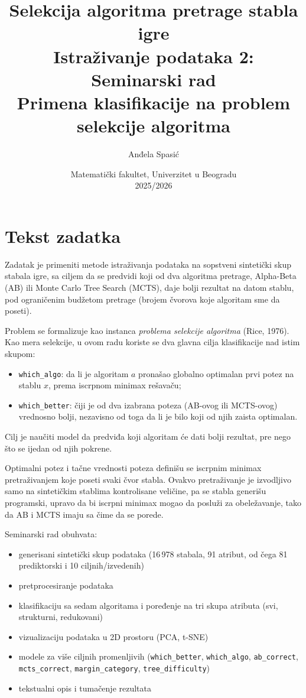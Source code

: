 \documentclass[12pt, a4paper]{article}
\title{
    \textbf{Selekcija algoritma pretrage stabla igre}\\[0.4em]
    \large Istraživanje podataka 2: Seminarski rad\\[0.3em]
    \normalsize Primena klasifikacije na problem selekcije algoritma
}
\author{Anđela Spasić}
\date{Matematički fakultet, Univerzitet u Beogradu\\2025/2026}
\begin{document}
\maketitle
\newpage
\tableofcontents
\newpage

\section{Tekst zadatka}

Zadatak je primeniti metode istraživanja podataka na sopstveni sintetički skup stabala igre,
sa ciljem da se predvidi koji od dva algoritma pretrage, Alpha-Beta (AB) ili Monte Carlo Tree
Search (MCTS), daje bolji rezultat na datom stablu, pod ograničenim budžetom pretrage
(brojem čvorova koje algoritam sme da poseti).

Problem se formalizuje kao instanca \textit{problema selekcije algoritma} (Rice, 1976). Kao mera selekcije, u ovom radu koriste se dva glavna cilja klasifikacije
nad istim skupom:

\begin{itemize}[noitemsep]
    \item \texttt{which\_algo}: da li je algoritam $a$ pronašao globalno optimalan
    prvi potez na stablu $x$, prema iscrpnom minimax rešavaču;
    \item \texttt{which\_better}: čiji je od dva izabrana poteza (AB-ovog ili
    MCTS-ovog) vrednosno bolji, nezavisno od toga da li je bilo koji od njih zaista optimalan.
\end{itemize}

Cilj je naučiti model da predviđa
koji algoritam će dati bolji rezultat, pre nego što se ijedan od njih pokrene.

Optimalni potez i tačne vrednosti poteza definišu se iscrpnim minimax pretraživanjem koje
poseti svaki čvor stabla. Ovakvo pretraživanje je izvodljivo samo na sintetičkim stablima
kontrolisane veličine, pa se stabla generišu programski, upravo da bi iscrpni minimax mogao
da posluži za obeležavanje, tako da AB i MCTS imaju sa čime da se porede.

Seminarski rad obuhvata:
\begin{itemize}[noitemsep]
    \item generisani sintetički skup podataka (16\,978 stabala, 91 atribut, od čega 81
    prediktorski i 10 ciljnih/izvedenih)
    \item pretprocesiranje podataka
    \item klasifikaciju sa sedam algoritama i poređenje na tri skupa atributa (svi, strukturni,
    redukovani)
    \item vizualizaciju podataka u 2D prostoru (PCA, t-SNE)
    \item modele za više ciljnih promenljivih (\texttt{which\_better}, \texttt{which\_algo},
    \texttt{ab\_correct}, \texttt{mcts\_correct}, \texttt{margin\_category},
    \texttt{tree\_difficulty})
    \item tekstualni opis i tumačenje rezultata
\end{itemize}
\end{document}
